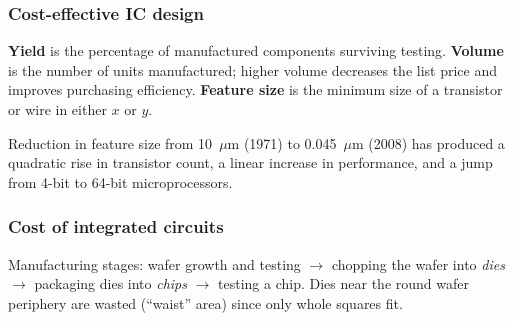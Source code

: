 \subsubsection{Cost-effective IC design}
\begin{definition}
\textbf{Yield} is the percentage of manufactured components surviving
testing. \textbf{Volume} is the number of units manufactured; higher volume
decreases the list price and improves purchasing efficiency. \textbf{Feature
size} is the minimum size of a transistor or wire in either $x$ or $y$.
\end{definition}
Reduction in feature size from 10~$\mu$m (1971) to 0.045~$\mu$m (2008) has
produced a quadratic rise in transistor count, a linear increase in
performance, and a jump from 4-bit to 64-bit microprocessors.

\subsubsection{Cost of integrated circuits}
Manufacturing stages: wafer growth and testing $\to$ chopping the wafer into
\emph{dies} $\to$ packaging dies into \emph{chips} $\to$ testing a chip. Dies
near the round wafer periphery are wasted (``waist'' area) since only whole
squares fit.

